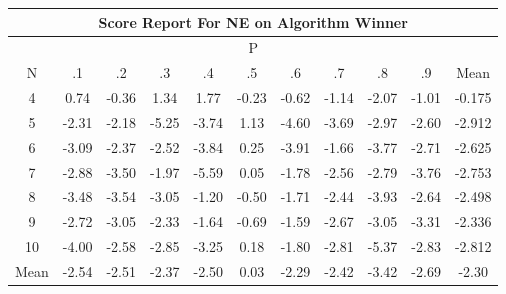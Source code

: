 \documentclass[11pt,a4paper]{report}
\begin{document}
\begin{longtable}{ | c || c | c | c | c | c | c | c | c | c || c |}
\hline
\multicolumn{11}{|c|}{ Score Report For NE on Algorithm Winner} \\
\hline
\multicolumn{11}{|c|}{ P } \\
\hline
N & .1 & .2 & .3 & .4 & .5 & .6 & .7 & .8 & .9 & Mean\\
 \hline
 \hline
 \endhead
  4 &  \cellcolor[HTML]{EFEFFF} 0.74 &  \cellcolor[HTML]{FFF7F7} -0.36 &  \cellcolor[HTML]{DFDFFF} 1.34 &  \cellcolor[HTML]{CFCFFF} 1.77 &  \cellcolor[HTML]{FFF7F7} -0.23 &  \cellcolor[HTML]{FFEFEF} -0.62 &  \cellcolor[HTML]{FFDFDF} -1.14 &  \cellcolor[HTML]{FFC7C7} -2.07 &  \cellcolor[HTML]{FFE7E7} -1.01 & -0.175 \\
  5 &  \cellcolor[HTML]{FFC7C7} -2.31 &  \cellcolor[HTML]{FFC7C7} -2.18 &  \cellcolor[HTML]{FF7878} -5.25 &  \cellcolor[HTML]{FF9F9F} -3.74 &  \cellcolor[HTML]{DFDFFF} 1.13 &  \cellcolor[HTML]{FF8F8F} -4.60 &  \cellcolor[HTML]{FF9F9F} -3.69 &  \cellcolor[HTML]{FFB7B7} -2.97 &  \cellcolor[HTML]{FFBFBF} -2.60 & -2.912 \\
  6 &  \cellcolor[HTML]{FFAFAF} -3.09 &  \cellcolor[HTML]{FFC7C7} -2.37 &  \cellcolor[HTML]{FFBFBF} -2.52 &  \cellcolor[HTML]{FF9F9F} -3.84 &  \cellcolor[HTML]{F7F7FF} 0.25 &  \cellcolor[HTML]{FF9F9F} -3.91 &  \cellcolor[HTML]{FFD7D7} -1.66 &  \cellcolor[HTML]{FF9F9F} -3.77 &  \cellcolor[HTML]{FFB7B7} -2.71 & -2.625 \\
  7 &  \cellcolor[HTML]{FFB7B7} -2.88 &  \cellcolor[HTML]{FFA7A7} -3.50 &  \cellcolor[HTML]{FFCFCF} -1.97 &  \cellcolor[HTML]{FF7070} -5.59 &  \cellcolor[HTML]{FFFFFF} 0.05 &  \cellcolor[HTML]{FFCFCF} -1.78 &  \cellcolor[HTML]{FFBFBF} -2.56 &  \cellcolor[HTML]{FFB7B7} -2.79 &  \cellcolor[HTML]{FF9F9F} -3.76 & -2.753 \\
  8 &  \cellcolor[HTML]{FFA7A7} -3.48 &  \cellcolor[HTML]{FFA7A7} -3.54 &  \cellcolor[HTML]{FFAFAF} -3.05 &  \cellcolor[HTML]{FFDFDF} -1.20 &  \cellcolor[HTML]{FFEFEF} -0.50 &  \cellcolor[HTML]{FFD7D7} -1.71 &  \cellcolor[HTML]{FFBFBF} -2.44 &  \cellcolor[HTML]{FF9F9F} -3.93 &  \cellcolor[HTML]{FFBFBF} -2.64 & -2.498 \\
  9 &  \cellcolor[HTML]{FFB7B7} -2.72 &  \cellcolor[HTML]{FFAFAF} -3.05 &  \cellcolor[HTML]{FFC7C7} -2.33 &  \cellcolor[HTML]{FFD7D7} -1.64 &  \cellcolor[HTML]{FFEFEF} -0.69 &  \cellcolor[HTML]{FFD7D7} -1.59 &  \cellcolor[HTML]{FFBFBF} -2.67 &  \cellcolor[HTML]{FFAFAF} -3.05 &  \cellcolor[HTML]{FFAFAF} -3.31 & -2.336 \\
  10 &  \cellcolor[HTML]{FF9797} -4.00 &  \cellcolor[HTML]{FFBFBF} -2.58 &  \cellcolor[HTML]{FFB7B7} -2.85 &  \cellcolor[HTML]{FFAFAF} -3.25 &  \cellcolor[HTML]{F7F7FF} 0.18 &  \cellcolor[HTML]{FFCFCF} -1.80 &  \cellcolor[HTML]{FFB7B7} -2.81 &  \cellcolor[HTML]{FF7878} -5.37 &  \cellcolor[HTML]{FFB7B7} -2.83 & -2.812 \\
 \hline
 \hline
Mean &  \cellcolor[HTML]{FFBFBF} -2.54 &  \cellcolor[HTML]{FFBFBF} -2.51 &  \cellcolor[HTML]{FFC7C7} -2.37 &  \cellcolor[HTML]{FFBFBF} -2.50 &  \cellcolor[HTML]{FFFFFF} 0.03 &  \cellcolor[HTML]{FFC7C7} -2.29 &  \cellcolor[HTML]{FFBFBF} -2.42 &  \cellcolor[HTML]{FFA7A7} -3.42 &  \cellcolor[HTML]{FFBFBF} -2.69 &  \cellcolor[HTML]{FFC7C7} -2.30
\end{longtable}
\end{document}
